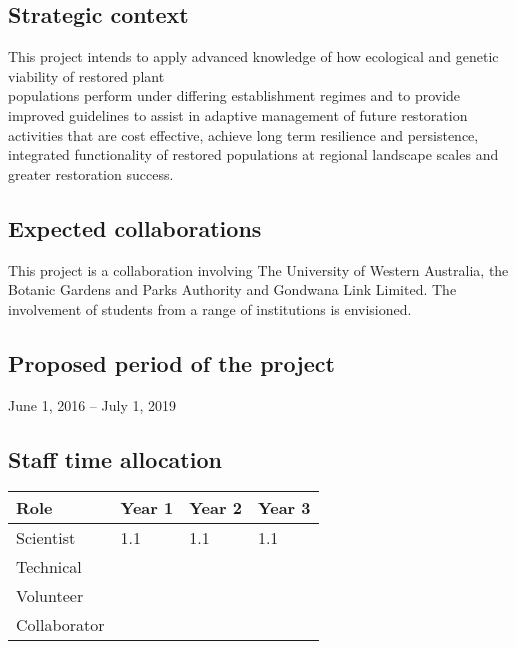 \documentclass[version=last,
    paper=a4, %
    10pt, %
    usenames,
    dvipsnames,
    oneside, %
    headings=openany, %
    DIV=15 %
]{scrbook}
\begin{document}
\subsection*{Strategic context}

This project intends to apply advanced knowledge of how ecological and
genetic viability of restored plant\\populations perform under differing
establishment regimes and to provide improved guidelines to assist in
adaptive management of future restoration activities that are cost
effective, achieve long term resilience and persistence, integrated
functionality of restored populations at regional landscape scales and
greater restoration success.




\subsection*{Expected collaborations}

This project is a collaboration involving The University of Western
Australia, the Botanic Gardens and Parks Authority and Gondwana Link
Limited. The involvement of students from a range of institutions is
envisioned.


\subsection*{Proposed period of the project}
June 1, 2016 -- July 1, 2019



\subsection*{Staff time allocation }



\begin{longtabu} to \linewidth { |  X | X | X | X | }
\hline
{}
Role & Year 1 & Year 2 & Year 3\\
\hline
\endhead



Scientist & 1.1 & 1.1 & 1.1\\



Technical &  &  & \\



Volunteer &  &  & \\



Collaborator &  &  & \\


\hline
\end{longtabu}
\end{document}
